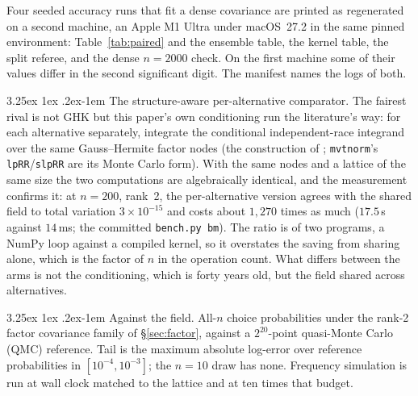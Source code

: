 \documentclass[11pt]{article}
\makeatletter
\renewcommand\paragraph{\@startsection{paragraph}{4}{\z@}%
  {3.25ex \@plus1ex \@minus.2ex}{-1em}%
  {\normalfont\normalsize\itshape}}
\makeatother
\begin{document}
Four seeded accuracy runs that fit a dense covariance are printed as
regenerated on a second machine, an Apple M1 Ultra under macOS~27.2 in
the same pinned environment: Table~\ref{tab:paired} and the ensemble
table, the kernel table, the split referee, and the dense $n=2000$
check. On the first machine some of their values differ in the second
significant digit. The manifest names the logs of both.

\paragraph{The structure-aware per-alternative comparator.} The fairest
rival is not GHK but this paper's own conditioning run the literature's
way: for each alternative separately, integrate the conditional
independent-race integrand over the same Gauss--Hermite factor nodes
(the construction of \citet{butler1982}; \texttt{mvtnorm}'s
\texttt{lpRR}/\texttt{slpRR} are its Monte Carlo form). With the same
nodes and a lattice of the same size the two computations are algebraically
identical, and the measurement
confirms it: at $n=200$, rank~2, the per-alternative
version agrees with the shared field to total variation
$3\times10^{-15}$ and costs about $1{,}270$ times as much ($17.5$\,s against
$14$\,ms; the committed \texttt{bench.py bm}). The ratio is of two programs, a NumPy loop against a compiled kernel, so it
overstates the saving from sharing alone, which is the factor of $n$ in
the operation count. What differs between the arms is not the
conditioning, which is forty years old, but the field shared across
alternatives.

\paragraph{Against the field.} All-$n$ choice probabilities under the rank-2
factor covariance family of \S\ref{sec:factor}, against a
$2^{20}$-point quasi-Monte Carlo (QMC) reference. Tail is the maximum absolute log-error over
reference probabilities in $[10^{-4},10^{-3}]$; the $n=10$ draw has none.
Frequency simulation is run at wall clock matched to the lattice and at ten
times that budget.
\end{document}
